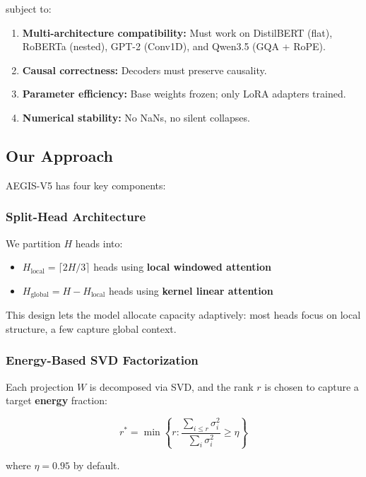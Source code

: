 subject to:

\begin{enumerate}
\item \textbf{Multi-architecture compatibility:} Must work on DistilBERT (flat),
  RoBERTa (nested), GPT-2 (Conv1D), and Qwen3.5 (GQA + RoPE).
\item \textbf{Causal correctness:} Decoders must preserve causality.
\item \textbf{Parameter efficiency:} Base weights frozen; only LoRA adapters trained.
\item \textbf{Numerical stability:} No NaNs, no silent collapses.

\end{enumerate}
\subsection{Our Approach}

AEGIS-V5 has four key components:

\subsubsection{Split-Head Architecture}

We partition $H$ heads into:

\begin{itemize}
\item $H_\text{local} = \lceil 2H/3 \rceil$ heads using \textbf{local windowed attention}
\item $H_\text{global} = H - H_\text{local}$ heads using \textbf{kernel linear attention}

\end{itemize}
This design lets the model allocate capacity adaptively: most heads focus 
on local structure, a few capture global context.

\subsubsection{Energy-Based SVD Factorization}

Each projection $W$ is decomposed via SVD, and the rank $r$ is chosen to 
capture a target \textbf{energy} fraction:

\begin{equation}
r^* = \min \left\{ r : \frac{\sum_{i \leq r} \sigma_i^2}{\sum_i \sigma_i^2} \geq \eta \right\}
\end{equation}

where $\eta = 0.95$ by default.

